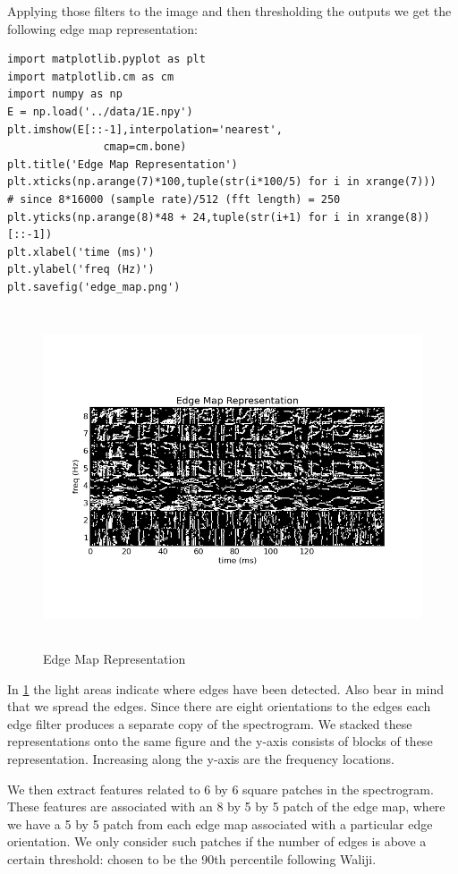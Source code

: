 \documentclass[11pt]{article}
\begin{document}
Applying those filters to the image and then thresholding the outputs
we get the following edge map representation:


\begin{verbatim}
import matplotlib.pyplot as plt
import matplotlib.cm as cm
import numpy as np
E = np.load('../data/1E.npy')
plt.imshow(E[::-1],interpolation='nearest',
               cmap=cm.bone)
plt.title('Edge Map Representation')
plt.xticks(np.arange(7)*100,tuple(str(i*100/5) for i in xrange(7)))
# since 8*16000 (sample rate)/512 (fft length) = 250
plt.yticks(np.arange(8)*48 + 24,tuple(str(i+1) for i in xrange(8))[::-1])
plt.xlabel('time (ms)')
plt.ylabel('freq (Hz)')
plt.savefig('edge_map.png')
\end{verbatim}



\begin{figure}[htb]
\centering
\includegraphics[height=10cm]{./edge_map.png}
\caption{\label{fig:edge_map}Edge Map Representation}
\end{figure}

In \ref{fig:edge_map} the light areas indicate where edges have been
detected. Also bear in mind that we spread the edges.  Since there are
eight orientations to the edges each edge filter produces a separate
copy of the spectrogram.  We stacked these representations onto the
same figure and the y-axis consists of blocks of these
representation. Increasing along the y-axis are the frequency locations.

We then extract features related to 6 by 6 square patches in the
spectrogram.  These features are associated with an 8 by 5 by 5 patch
of the edge map, where we have a 5 by 5 patch from each edge map
associated with a particular edge orientation.  We only consider such
patches if the number of edges is above a certain threshold: chosen to 
be the 90th percentile following Waliji.
\end{document}
